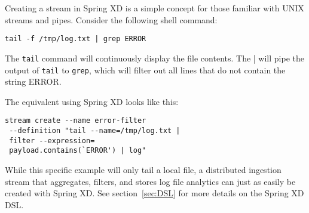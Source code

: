 Creating a stream in Spring XD is a simple concept for those familiar with
UNIX streams and pipes. Consider the following shell command:

\begin{lstlisting}
tail -f /tmp/log.txt | grep ERROR
\end{lstlisting}

The \texttt{tail} command will continuously display the file contents. The |
will pipe the output of \texttt{tail} to \texttt{grep}, which will filter 
out all lines that do not contain the string ERROR.

The equivalent using Spring XD looks like this:

\begin{lstlisting}
stream create --name error-filter
 --definition "tail --name=/tmp/log.txt |
 filter --expression=
 payload.contains(`ERROR') | log"
\end{lstlisting}

While this specific example will only tail a local file, a distributed 
ingestion stream that aggregates, filters, and stores log file analytics
can just as easily be created with Spring XD. See section~\ref{sec:DSL} for more
details on the Spring XD DSL.
